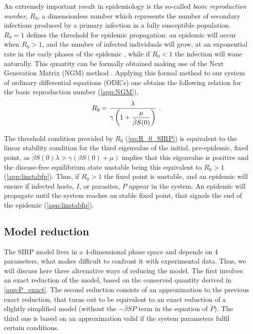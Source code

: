 An extremely important result in epidemiology is the so-called
\textit{basic reproduction number}, $R_0$, a dimensionless number which
represents the number of secondary infections produced by a primary infection
in a fully susceptible population. $R_0=1$ defines the threshold for epidemic
propagation: an epidemic will occur when $R_0>1$, and the number of infected
individuals will grow, at an exponential rate in the early phases of the
epidemic \cite{Castro2020}, while if $R_0<1$ the infection will wane
naturally.
This quantity can be formally obtained making use of the Next Generation
Matrix (NGM) method \cite{Theory_next_gen_matrix, Diekmann2010}. Applying this
formal method to our system of ordinary differential equations (ODE's) one
obtains the following relation for the basic reproduction number
(\cref{app:NGM}),
\begin{equation}\label{eq:R_0_SIRP}
    R_0=\frac{\lambda}{\gamma\left(1+\displaystyle\frac{\mu}{\bar{\beta}
                S(0)}\right)} \ .
\end{equation}

The threshold condition provided by $R_0$ (\cref{eq:R_0_SIRP}) is
equivalent
to the linear stability condition for the third eigenvalue of the initial,
pre-epidemic, fixed point, as $\bar{\beta} S(0) \lambda>\gamma(\beta S(0)+\mu)$
implies that this eigenvalue is positive and the disease-free equilibrium
state unstable being this
equivalent to $R_0>1$ (\cref{app:linstabfp}).
Thus, if $R_0>1$ the fixed point is unstable, and an epidemic will ensure
if infected hosts, $I$, or parasites, $P$ appear in the system. An epidemic
will propagate until the system reaches an stable fixed point, that signals the
end of the epidemic (\cref{app:linstabfp}).

\subsection{Model reduction} \label{sec:reduction}

The SIRP model lives in a $4$-dimensional phase space and depends on $4$
parameters, what makes difficult to confront it with experimental data. Thus,
we will discuss here
three alternative ways of reducing the model. The first involves an exact
reduction of the model, based on the conserved quantity derived in
\cref{app:P_exact}. The second reduction consists of an approximation to the
previous exact reduction, that turns out to be equivalent to an exact reduction
of a slightly simplified model (without the $-\bar{\beta}SP$ term in the
equation of $\dot{P}$). The third one is based on an approximation valid if the
system parameters fulfil certain conditions.

